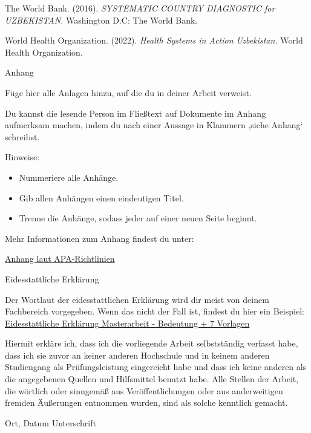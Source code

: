 The World Bank. (2016). \emph{SYSTEMATIC COUNTRY DIAGNOSTIC for
UZBEKISTAN.} Washington D.C: The World Bank.

World Health Organization. (2022). \emph{Health Systems in Action
Uzbekistan.} World Health Organization.

Anhang

Füge hier alle Anlagen hinzu, auf die du in deiner Arbeit verweist.

Du kannst die lesende Person im Fließtext auf Dokumente im Anhang
aufmerksam machen, indem du nach einer Aussage in Klammern ‚siehe
Anhang` schreibst.

Hinweise:

\begin{itemize}
\item
  Nummeriere alle Anhänge.
\item
  Gib allen Anhängen einen eindeutigen Titel.
\item
  Trenne die Anhänge, sodass jeder auf einer neuen Seite beginnt.
\end{itemize}

Mehr Informationen zum Anhang findest du unter:

\href{https://www.scribbr.de/apa-standard/anhang/}{Anhang laut
APA-Richtlinien}

Eidesstattliche Erklärung

Der Wortlaut der eidesstattlichen Erklärung wird dir meist von deinem
Fachbereich vorgegeben. Wenn das nicht der Fall ist, findest du hier ein
Beispiel:
\href{https://www.scribbr.de/masterarbeit/eidesstattliche-erklaerung-masterarbeit/}{Eidesstattliche
Erklärung Masterarbeit - Bedeutung + 7 Vorlagen}

Hiermit erkläre ich, dass ich die vorliegende Arbeit selbstständig
verfasst habe, dass ich sie zuvor an keiner anderen Hochschule und in
keinem anderen Studiengang als Prüfungsleistung eingereicht habe und
dass ich keine anderen als die angegebenen Quellen und Hilfsmittel
benutzt habe. Alle Stellen der Arbeit, die wörtlich oder sinngemäß aus
Veröffentlichungen oder aus anderweitigen fremden Äußerungen entnommen
wurden, sind als solche kenntlich gemacht.

Ort, Datum Unterschrift
